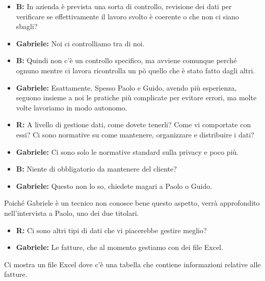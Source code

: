 \documentclass{elegantbook}
\begin{document}
	\begin{itemize}
		\item\textbf{B}\textbf{:} In azienda è prevista una sorta di controllo, revisione dei dati per verificare se effettivamente il lavoro svolto è coerente o
                    che non ci siano sbagli? 
		\item\textbf{Gabriele}\textbf{:} Noi ci controlliamo tra di noi.
		\item\textbf{B}\textbf{:} Quindi non c'è un controllo specifico, ma avviene comunque perché ognuno mentre ci lavora ricontrolla un pò quello che è stato
                    fatto dagli altri.
		\item\textbf{Gabriele}\textbf{:} Esattamente. Spesso Paolo e Guido, avendo più esperienza, seguono insieme a noi le pratiche più complicate per evitare
                    errori, ma molte volte lavoriamo in modo autonomo.
		\item\textbf{R}\textbf{:} A livello di gestione dati, come dovete tenerli? Come vi comportate con essi? Ci sono normative su come mantenere, organizzare e
                    distribuire i dati?
		\item\textbf{Gabriele}\textbf{:} Ci sono solo le normative standard sulla privacy e poco più.
		\item\textbf{B}\textbf{:} Niente di obbligatorio da mantenere del cliente?
		\item\textbf{Gabriele}\textbf{:} Questo non lo so, chiedete magari a Paolo o Guido.
                \\
	\end{itemize}
	Poiché Gabriele è un tecnico non conosce bene questo aspetto, verrà approfondito nell'intervista a Paolo, uno dei due titolari.
        \\
	\begin{itemize}
		\item\textbf{R}\textbf{:} Ci sono altri tipi di dati che vi piacerebbe gestire meglio?
		\item\textbf{Gabriele}\textbf{:} Le fatture, che al momento gestiamo con dei file Excel. 
                \\
	\end{itemize}
	Ci mostra un file Excel dove c'è una tabella che contiene informazioni relative alle fatture.
        \\
\end{document}

